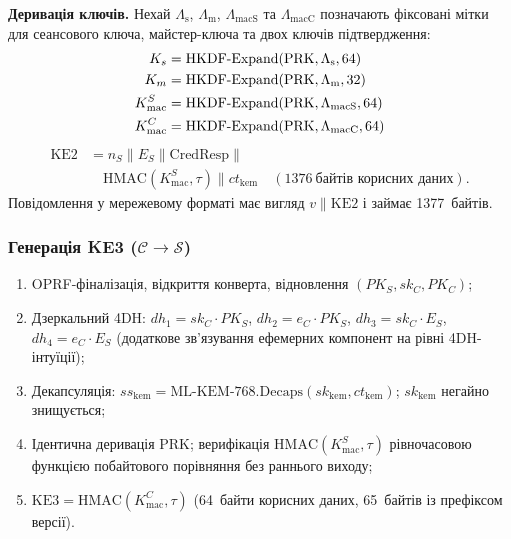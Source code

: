 \documentclass{llncs}
\newcommand{\KLabel}[1]{\Lambda_{\mathrm{#1}}}
\begin{document}
\textbf{Деривація ключів.} Нехай
$\KLabel{s}$, $\KLabel{m}$, $\KLabel{macS}$ та $\KLabel{macC}$
позначають фіксовані мітки для сеансового ключа, майстер-ключа та двох
ключів підтвердження:
\begin{align}
  K_s &= \mathrm{HKDF\text{-}Expand}(\mathrm{PRK}, \KLabel{s}, 64)
  \notag\\
  K_m &= \mathrm{HKDF\text{-}Expand}(\mathrm{PRK}, \KLabel{m}, 32)
  \notag\\
  K_{\mathrm{mac}}^S &= \mathrm{HKDF\text{-}Expand}(\mathrm{PRK},
    \KLabel{macS}, 64)
    \notag\\
  K_{\mathrm{mac}}^C &= \mathrm{HKDF\text{-}Expand}(\mathrm{PRK},
    \KLabel{macC}, 64)
  \label{eq:key-derivation}
\end{align}
\begin{align}
  \mathrm{KE2} &= n_S \| E_S \| \mathrm{CredResp} \| {}\\
  &\quad \mathrm{HMAC}(K_{\mathrm{mac}}^S, \tau) \| ct_{\mathrm{kem}}
    \quad(1376~\text{байтів корисних даних}).
\end{align}
Повідомлення у мережевому форматі має вигляд $v \| \mathrm{KE2}$ і займає 1377~байтів.

\subsubsection{Генерація KE3 ($\mathcal{C} \to \mathcal{S}$)}

\begin{enumerate}
  \item OPRF-фіналізація, відкриття конверта, відновлення
        $(PK_S, sk_C, PK_C)$;
  \item Дзеркальний 4DH: $dh_1 = sk_C \cdot PK_S$,
        $dh_2 = e_C \cdot PK_S$, $dh_3 = sk_C \cdot E_S$,
        $dh_4 = e_C \cdot E_S$ (додаткове зв'язування ефемерних
        компонент на рівні 4DH-інтуїції);
  \item Декапсуляція: $ss_{\mathrm{kem}} =
        \mathrm{ML\text{-}KEM\text{-}768.Decaps}(sk_{\mathrm{kem}},
        ct_{\mathrm{kem}})$; $sk_{\mathrm{kem}}$ негайно знищується;
  \item Ідентична деривація PRK; верифікація
        $\mathrm{HMAC}(K_{\mathrm{mac}}^S, \tau)$ рівночасовою
        функцією побайтового порівняння без раннього виходу;
  \item $\mathrm{KE3} = \mathrm{HMAC}(K_{\mathrm{mac}}^C, \tau)$
        (64~байти корисних даних, 65~байтів із префіксом версії).
\end{enumerate}
\end{document}
